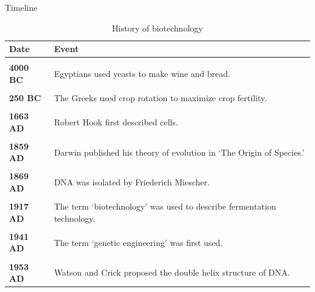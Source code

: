 \documentclass[
  ignorenonframetext,
  aspectratio=169]{beamer}
\begin{document}
\begin{frame}{Timeline}
\protect\hypertarget{timeline}{}
\begin{table}

\caption{\label{tab:biotechnology-history1}History of biotechnology}
\centering
\fontsize{5}{7}\selectfont
\begin{tabular}[t]{>{}l>{\raggedright\arraybackslash}p{40em}}
\toprule
Date & Event\\
\midrule
\textbf{\cellcolor{gray!6}{5000 BC}} & \cellcolor{gray!6}{Indus and Indo-Aryan civilizations practiced biotechnology to produce fermented foods and medicines and to keep the environment clean.}\\
\textbf{4000 BC} & Egyptians used yeasts to make wine and bread.\\
\textbf{\cellcolor{gray!6}{1750 BC}} & \cellcolor{gray!6}{The Sumerians brewed beer.}\\
\textbf{250 BC} & The Greeks used crop rotation to maximize crop fertility.\\
\textbf{\cellcolor{gray!6}{1500 AD}} & \cellcolor{gray!6}{The Aztecs made cake from spirulina.}\\
\addlinespace
\textbf{1663 AD} & Robert Hook first described cells.\\
\textbf{\cellcolor{gray!6}{1675 AD}} & \cellcolor{gray!6}{Microbes were first described by Anton Van Leeuwenhock.}\\
\textbf{1859 AD} & Darwin published his theory of evolution in ‘The Origin of Species.’\\
\textbf{\cellcolor{gray!6}{1866 AD}} & \cellcolor{gray!6}{Gregor John Mendel published the basic laws of genetics.}\\
\textbf{1869 AD} & DNA was isolated by Friederich Miescher.\\
\addlinespace
\textbf{\cellcolor{gray!6}{1910 AD}} & \cellcolor{gray!6}{Genes were discovered to be present in chromosomes.}\\
\textbf{1917 AD} & The term ‘biotechnology’ was used to describe fermentation technology.\\
\textbf{\cellcolor{gray!6}{1928 AD}} & \cellcolor{gray!6}{The first antibiotic, penicillin, was discovered by Alexander Flemming.}\\
\textbf{1941 AD} & The term ‘genetic engineering’ was first used.\\
\textbf{\cellcolor{gray!6}{1944 AD}} & \cellcolor{gray!6}{Hereditary material was identified as DNA.}\\
\addlinespace
\textbf{1953 AD} & Watson and Crick proposed the double helix structure of DNA.\\
\bottomrule
\end{tabular}
\end{table}
\end{frame}
\end{document}
